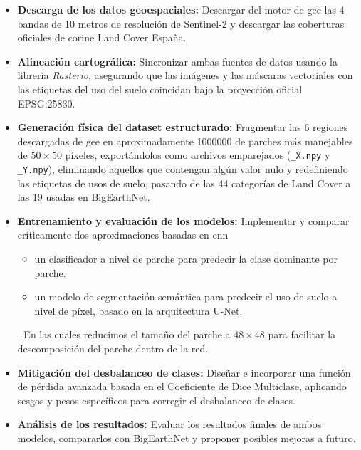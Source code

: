 \begin{itemize}
    \item \textbf{Descarga de los datos geoespaciales:} Descargar del motor de \acrshort{gee} las 4 bandas de 10 metros de resolución de Sentinel-2 y descargar las coberturas oficiales de \acrshort{corine} Land Cover España.
    \item \textbf{Alineación cartográfica:} Sincronizar ambas fuentes de datos usando la librería \textit{Rasterio}, asegurando que las imágenes y las máscaras vectoriales con las etiquetas del uso del suelo coincidan bajo la proyección oficial EPSG:25830.
    \item \textbf{Generación física del dataset estructurado:} Fragmentar las 6 regiones descargadas de \acrshort{gee} en aproximadamente 1000000 de parches más manejables de $50\times50$ píxeles, exportándolos como archivos emparejados (\texttt{\_X.npy} y \texttt{\_Y.npy}), eliminando aquellos que contengan algún valor nulo y redefiniendo las etiquetas de usos de suelo, pasando de las 44 categorías de Land Cover a las 19 usadas en BigEarthNet.
    \item \textbf{Entrenamiento y evaluación de los modelos:} Implementar y comparar críticamente dos aproximaciones basadas en \acrshort{cnn}\begin{itemize}
        \item un clasificador a nivel de parche para predecir la clase dominante por parche.
        \item un modelo de segmentación semántica para predecir el uso de suelo a nivel de píxel, basado en la arquitectura U-Net.
    \end{itemize}. En las cuales reducimos el tamaño del parche a $48\times 48$ para facilitar la descomposición del parche dentro de la red.
    \item \textbf{Mitigación del desbalanceo de clases:} Diseñar e incorporar una función de pérdida avanzada basada en el Coeficiente de Dice Multiclase, aplicando sesgos y pesos específicos para corregir el desbalanceo de clases.
    \item \textbf{Análisis de los resultados:} Evaluar los resultados finales de ambos modelos, compararlos con BigEarthNet y proponer posibles mejoras a futuro.
\end{itemize}
